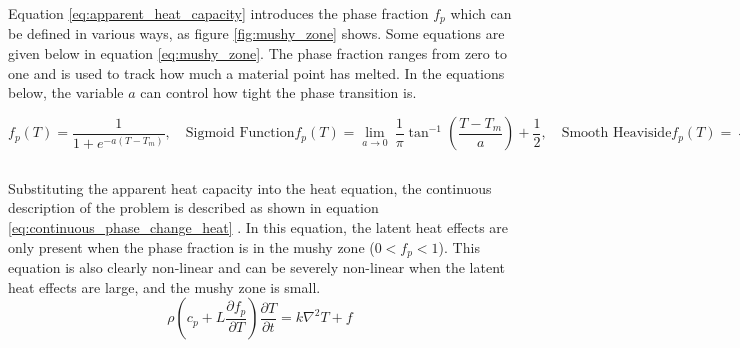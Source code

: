 Equation \ref{eq:apparent_heat_capacity} introduces the phase fraction $f_p$ which can be defined in various ways, as figure \ref{fig:mushy_zone} shows. Some equations are given below in equation \ref{eq:mushy_zone}. The phase fraction ranges from zero to one and is used to track how much a material point has melted. In the equations below, the variable $a$ can control how tight the phase transition is.
\begin{subequations}
    \begin{equation}
        f_p(T) = \frac{1}{1+e^{-a(T-T_m)}}, \quad \text{Sigmoid Function}
    \end{equation}
    \begin{equation}
        f_p(T) = \lim_{a\to 0} \ \frac{1}{\pi}\tan^{-1}\left(\frac{T-T_m}{a}\right) + \frac{1}{2}, \quad \text{Smooth Heaviside}
    \end{equation}
    \begin{equation}
        f_p(T) = \begin{cases}
            0, \quad &\text{In solid phase} \\
            \frac{1}{2\Delta T}(T-T_m), &\text{In mushy zone} \\
            1, \quad &\text{In liquid phase}
        \end{cases}, \quad \text{Linear Function}
    \end{equation}
    \label{eq:mushy_zone}
\end{subequations}

Substituting the apparent heat capacity into the heat equation, the continuous description of the problem is described as shown in equation \ref{eq:continuous_phase_change_heat} \cite{Nallathambi_Specht_Bertram_2009}. In this equation, the latent heat effects are only present when the phase fraction is in the mushy zone ($0<f_p<1$). This equation is also clearly non-linear and can be severely non-linear when the latent heat effects are large, and the mushy zone is small.
\begin{equation}
    \rho\left (c_p+L\frac{\partial f_p}{\partial T} \right )\frac{\partial T}{\partial t} = k\nabla^2T + f
    \label{eq:continuous_phase_change_heat}
\end{equation}

